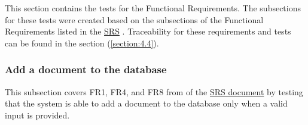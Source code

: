\documentclass[12pt, titlepage]{article}
\begin{document}

This section contains the tests for the Functional Requirements. The subsections for these tests were created based on the subsections of the Functional Requirements listed in the \href{https://github.com/Inreet-Kaur/capstone/blob/main/docs/SRS/SRS.pdf}{SRS} \citep{SRS}. Traceability for these requirements and tests can be found in the section (\ref{section:4.4}).


\subsubsection{Add a document to the database} \label{section:4.1.1}

This subsection covers FR1, FR4, and FR8 from of the \href{https://github.com/Inreet-Kaur/capstone/blob/main/docs/SRS/SRS.pdf}{SRS document} \citep{SRS} by testing that the system is able to add a document to the database only when a valid input is provided.
\end{document}
